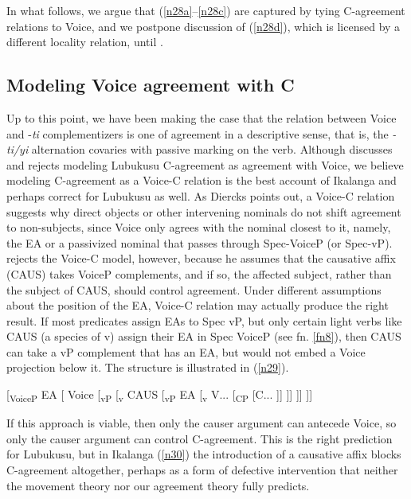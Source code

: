 \documentclass[output=paper,
modfonts
]{langscibook}
\begin{document}
In what follows, we argue that (\ref{n28a}--\ref{n28c}) are captured by tying C-agreement relations to Voice, and we postpone discussion of (\ref{n28d}), which is licensed by a different locality relation, until . 


\subsection{Modeling Voice agreement with C}
\label{sec:letsholo:3.3}
Up to this point, we have been making the case that the relation between Voice and -\textit{ti} complementizers is one of agreement in a descriptive sense, that is, the \textit{-ti/yi} alternation covaries with passive marking on the verb. Although \citet[353--370]{Diercks2010} discusses and rejects modeling Lubukusu C-agreement as agreement with Voice, we believe modeling C-agreement as a Voice-C relation is the best account of Ikalanga and perhaps correct for Lubukusu as well. As Diercks points out, a Voice-C relation suggests why direct objects or other intervening nominals do not shift agreement to non-subjects, since Voice only agrees with the nominal closest to it, namely, the EA or a passivized nominal that passes through Spec-VoiceP (or Spec-vP). \citeauthor{Diercks2010} rejects the Voice-C model, however, because he assumes that the causative affix (CAUS) takes VoiceP complements, and if so, the affected subject, rather than the subject of CAUS, should control agreement. Under different assumptions about the position of the EA, Voice-C relation may actually produce the right result. If most predicates assign EAs to Spec vP, but only certain light verbs like CAUS (a species of v) assign their EA in Spec VoiceP (see fn. \ref{fn8}), then CAUS can take a vP complement that has an EA, but would not embed a Voice projection below it. The structure is illustrated in (\ref{n29}).

\ea\label{n29} \textup{[\textsubscript{VoiceP} EA  [ Voice [\textsubscript{vP} [\textsubscript{v}  CAUS [\textsubscript{vP}  EA [\textsubscript{v} V...  [\textsubscript{CP} [C... ]] ]] ]] ]]} \z 

If this approach is viable, then only the causer argument can antecede Voice, so only the causer argument can control C-agreement. This is the right prediction for Lubukusu, but in Ikalanga (\ref{n30}) the introduction of a causative affix blocks C-agreement altogether, perhaps as a form of defective intervention that neither the movement theory nor our agreement theory fully predicts.  
\end{document}
